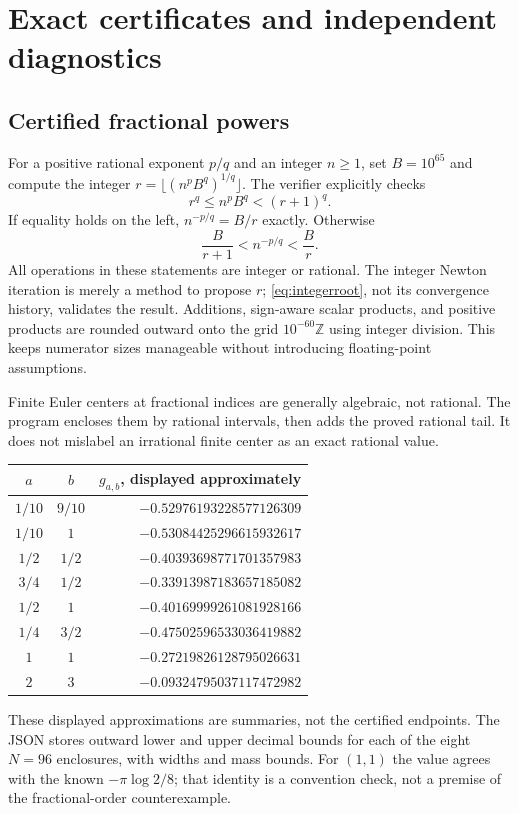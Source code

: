 \documentclass[11pt]{article}
\numberwithin{equation}{section}
\theoremstyle{definition}\newtheorem{definition}[theorem]{Definition}
\theoremstyle{remark}\newtheorem{remark}[theorem]{Remark}
\begin{document}
\section{Exact certificates and independent diagnostics}
\label{sec:certificates}

\subsection{Certified fractional powers}
For a positive rational exponent $p/q$ and an integer $n\ge1$, set
$B=10^{65}$ and compute the integer
$r=\lfloor(n^pB^q)^{1/q}\rfloor$. The verifier explicitly checks
\begin{equation}\label{eq:integerroot}
 r^q\le n^pB^q<(r+1)^q.
\end{equation}
If equality holds on the left, $n^{-p/q}=B/r$ exactly. Otherwise
\begin{equation}\label{eq:rootinterval}
 \frac B{r+1}<n^{-p/q}<\frac B r.
\end{equation}
All operations in these statements are integer or rational. The
integer Newton iteration is merely a method to propose $r$;
\eqref{eq:integerroot}, not its convergence history, validates the
result. Additions, sign-aware scalar products, and positive products
are rounded outward onto the grid $10^{-60}\mathbb Z$ using integer
division. This keeps numerator sizes manageable without introducing
floating-point assumptions.

Finite Euler centers at fractional indices are generally algebraic,
not rational. The program encloses them by rational intervals, then
adds the proved rational tail. It does not mislabel an irrational
finite center as an exact rational value.

\begin{center}
\small
\begin{tabular}{@{}c c r@{}}
\toprule
$a$ & $b$ & $g_{a,b}$, displayed approximately\\
\midrule
$1/10$ & $9/10$ & $-0.52976193228577126309$\\
$1/10$ & $1$ & $-0.53084425296615932617$\\
$1/2$ & $1/2$ & $-0.40393698771701357983$\\
$3/4$ & $1/2$ & $-0.33913987183657185082$\\
$1/2$ & $1$ & $-0.40169999261081928166$\\
$1/4$ & $3/2$ & $-0.47502596533036419882$\\
$1$ & $1$ & $-0.27219826128795026631$\\
$2$ & $3$ & $-0.09324795037117472982$\\
\bottomrule
\end{tabular}
\end{center}
These displayed approximations are summaries, not the certified
endpoints. The JSON stores outward lower and upper decimal bounds
for each of the eight $N=96$ enclosures, with widths and mass bounds.
For $(1,1)$ the value agrees with the known
$-\pi\log2/8$; that identity is a convention check, not a premise of
the fractional-order counterexample.
\end{document}

